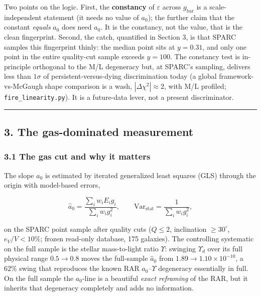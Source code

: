 \documentclass[
]{article}
\begin{document}
Two points on the logic. First, the \textbf{constancy} of
\(\varepsilon\) across \(g_\mathrm{bar}\) is a scale-independent statement
(it needs no value of \(a_0\)); the further claim that the constant
\emph{equals} \(a_0\) does need \(a_0\). It is the constancy, not the
value, that is the clean fingerprint. Second, the catch, quantified in
Section 3, is that SPARC samples this fingerprint thinly: the median
point sits at \(y=0.31\), and only one point in the entire quality-cut
sample exceeds \(y=100\). The constancy test is in-principle orthogonal
to the M/L degeneracy but, at SPARC's sampling, delivers less than
\(1\sigma\) of persistent-versus-dying discrimination today (a global
framework-vs-McGaugh shape comparison is a wash,
\(|\Delta\chi^2|\approx2\), with M/L profiled;
\texttt{fire\_linearity.py}). It is a future-data lever, not a present
discriminator.

\begin{center}\rule{0.5\linewidth}{0.5pt}\end{center}

\subsection{3. The gas-dominated
measurement}\label{the-gas-dominated-measurement}

\subsubsection{3.1 The gas cut and why it
matters}\label{the-gas-cut-and-why-it-matters}

The slope \(a_0\) is estimated by iterated generalized least squares
(GLS) through the origin with model-based errors,

\[\hat a_0=\frac{\sum_i w_i E_i g_i}{\sum_i w_i g_i^2},\qquad \mathrm{Var}_\mathrm{stat}=\frac{1}{\sum_i w_i g_i^2},\]

on the SPARC point sample after quality cuts (\(Q\le2\), inclination
\(\ge30^\circ\), \(e_V/V<10\%\); frozen read-only database, 175
galaxies). The controlling systematic on the full sample is the stellar
mass-to-light ratio \(\Upsilon\): swinging \(\Upsilon_d\) over its full
physical range \(0.5\to0.8\) moves the full-sample \(\hat a_0\) from
\(1.89\to1.10\times10^{-10}\), a \(62\%\) swing that reproduces the
known RAR \(a_0\)--\(\Upsilon\) degeneracy essentially in full. On the
full sample the \(a_0\)-line is a beautiful \emph{exact reframing} of
the RAR, but it inherits that degeneracy completely and adds no
information.
\end{document}
